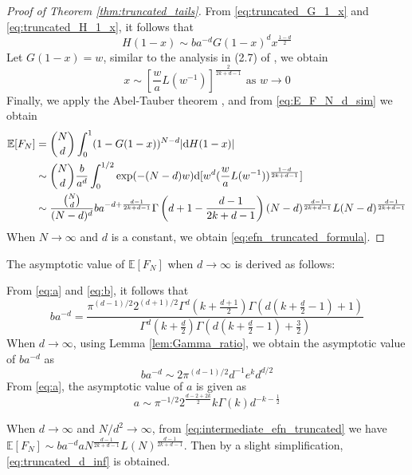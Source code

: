 \documentclass{aptpub}
\def\E{\mathbb{E}}
\def\d{\mathrm{d}}
\begin{document}
\begin{proof}[Proof of Theorem \ref{thm:truncated_tails}]
From \eqref{eq:truncated_G_1_x} and \eqref{eq:truncated_H_1_x}, it follows that
\begin{equation}
    H(1-x) \sim ba^{-d} G(1-x)^d x^{\frac{1-d}{2}}
\end{equation}
Let $G(1-x)=w$, similar to the analysis in (2.7) of
\cite{carnal1970konvexe}, we obtain
\begin{equation*}
     x \sim [\frac{w}{a} L(w^{-1})]^{\frac{2}{2k+d-1}} \textrm{ as } w \to 0
\end{equation*}
Finally, 
we apply the Abel-Tauber theorem
\cite{omey1989abelian}, and from \eqref{eq:E_F_N_d_sim} we obtain
\begin{align}
    \E[F_N] &= \binom{N}{d}\int_0^1 (1 - G(1-x))^{N-d} |\d H(1-x)| 
    \notag \\
    & \sim \binom{N}{d} \frac{b}{a^d} \int_0^{1/2} \exp(-(N-d)w) \d [w^d (\frac{w}{a} L(w^{-1}))^{\frac{1-d}{2k+d-1}} ]
    \notag \\
    &\sim \frac{\binom{N}{d}}{(N-d)^d} ba^{-d+\frac{d-1}{2k+d-1}}
    \Gamma 
    \left(d+1-\frac{d-1}{2k+d-1}\right)
    (N-d)^{\frac{d-1}{2k+d-1}}
    L(N-d)
    ^{\frac{d-1}{2k+d-1}}
    \label{eq:intermediate_efn_truncated}
\end{align}
When $N\to \infty$ and $d$ is a constant, we obtain \eqref{eq:efn_truncated_formula}.
\end{proof}

The asymptotic value of $\E[F_N]$ when $d\to \infty$
is derived as follows:

From \eqref{eq:a} and \eqref{eq:b}, it follows that
\begin{equation}
     ba^{-d}
     = \frac{\pi^{(d-1)/2} 2^{(d+1)/2}
     \Gamma^d(k+\frac{d+1}{2})
     \Gamma(d(k+\frac{d}{2}-1)+1)}{\Gamma^d(k+\frac{d}{2})\Gamma(d(k+\frac{d}{2}-1)+ \frac{3}{2})}
 \end{equation}
 When $d\to \infty$, using Lemma \ref{lem:Gamma_ratio},
 we obtain the asymptotic value of $ba^{-d}$ as
 \begin{equation}
     ba^{-d} \sim 2\pi^{(d-1)/2}
     d^{-1}e^kd^{d/2}
 \end{equation}
 From \eqref{eq:a}, the asymptotic value of $a$ is given as
 \begin{equation}
     a \sim \pi^{-1/2} 2^{\frac{d-2+2k}{2}} k \Gamma(k) d^{-k-\frac{1}{2}}
 \end{equation}

When $d\to \infty$ and $N/d^2\to \infty$,
from \eqref{eq:intermediate_efn_truncated}
we have $\E[F_N] \sim ba^{-d} a N^{\frac{d-1}{2k+d-1}}
L(N)
^{\frac{d-1}{2k+d-1}}$.
Then by a slight simplification,
\eqref{eq:truncated_d_inf} is obtained.
 
\end{document}
